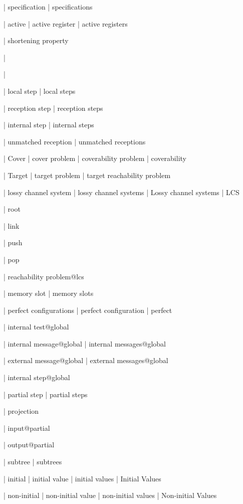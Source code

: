 | specification
| specifications


| active
| active register
| active registers

| shortening property

| \memoryproj

| \memoryproj

| local step
| local steps

| reception step
| reception steps

| internal step
| internal steps

| unmatched reception
| unmatched receptions




| Cover
| cover problem
| coverability problem
| coverability

| Target
| target problem
| target reachability problem


| lossy channel system
| lossy channel systems
| Lossy channel systems
| LCS

| root

| link

| push

| pop

| reachability problem@lcs


| memory slot
| memory slots

| perfect configurations
| perfect configuration
| perfect


| internal test@global

| internal message@global
| internal messages@global

| external message@global
| external messages@global

| internal step@global

| partial step
| partial steps

| projection

| input@partial

| output@partial

| subtree
| subtrees

| initial
| initial value
| initial values
| Initial Values

| non-initial
| non-initial value
| non-initial values
| Non-initial Values